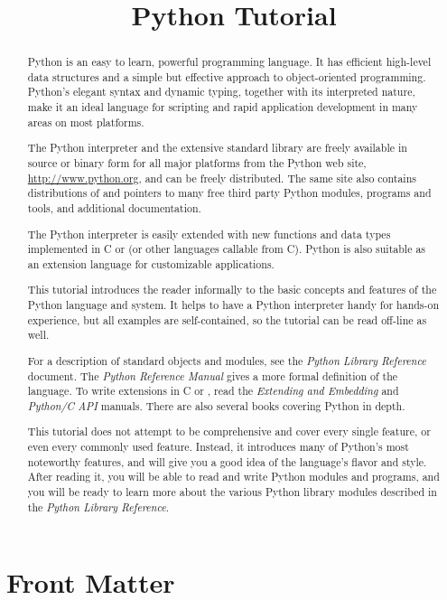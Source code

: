 \documentclass{manual}
\title{Python Tutorial}
\begin{document}
\maketitle

\ifhtml
\chapter*{Front Matter\label{front}}
\fi



\begin{abstract}

\noindent
Python is an easy to learn, powerful programming language.  It has
efficient high-level data structures and a simple but effective
approach to object-oriented programming.  Python's elegant syntax and
dynamic typing, together with its interpreted nature, make it an ideal 
language for scripting and rapid application development in many areas 
on most platforms.

The Python interpreter and the extensive standard library are freely
available in source or binary form for all major platforms from the
Python web site, \url{http://www.python.org}, and can be freely
distributed.  The same site also contains distributions of and
pointers to many free third party Python modules, programs and tools,
and additional documentation.

The Python interpreter is easily extended with new functions and data
types implemented in C or \Cpp{} (or other languages callable from C).
Python is also suitable as an extension language for customizable
applications.

This tutorial introduces the reader informally to the basic concepts
and features of the Python language and system.  It helps to have a
Python interpreter handy for hands-on experience, but all examples are
self-contained, so the tutorial can be read off-line as well.

For a description of standard objects and modules, see the
\emph{Python Library Reference} document.  The \emph{Python Reference
Manual} gives a more formal definition of the language.  To write
extensions in C or \Cpp{}, read the \emph{Extending and Embedding} and
\emph{Python/C API} manuals.  There are also several books covering
Python in depth.

This tutorial does not attempt to be comprehensive and cover every
single feature, or even every commonly used feature.  Instead, it
introduces many of Python's most noteworthy features, and will give
you a good idea of the language's flavor and style.  After reading it,
you will be able to read and write Python modules and programs, and
you will be ready to learn more about the various Python library
modules described in the \emph{Python Library Reference}.

\end{abstract}
\end{document}
